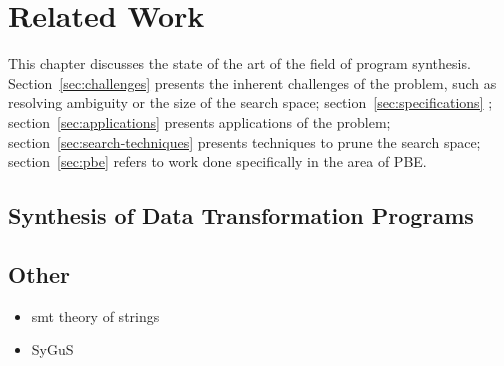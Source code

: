 \chapter{Related Work}
\label{chapter:relatedWork}


This chapter discusses the state of the art of the field of program synthesis.
Section~\ref{sec:challenges} presents the inherent challenges of the problem,
such as resolving ambiguity or the size of the search space;
section~\ref{sec:specifications} ;
section~\ref{sec:applications}
presents applications of the problem; section~\ref{sec:search-techniques}
presents techniques to prune the search space; section~\ref{sec:pbe} refers to
work done specifically in the area of \ac{PBE}.







\section{Synthesis of Data Transformation Programs}
\label{sec:data-trans-synth}


\section{Other}
\label{sec:other}

\begin{itemize}
\item smt theory of strings
\item SyGuS
\end{itemize}

